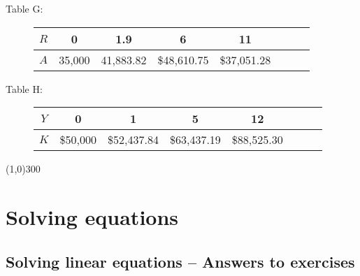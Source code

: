 \bigskip
\begin{description}
\item[\quad Table G: \quad] 
\begin{tabular} {|c| |c|c |c|c |c|c |c|}\hline
$R$ & 0 & 1.9 & 6 & 11\\ \hline
$A$ & 35,000 & 41,883.82 & \$48,610.75 &\$37,051.28  \\ \hline
\end{tabular}
\end{description}
 
\begin{description}
\item[\quad Table H: \quad] 
\begin{tabular} {|c| |c|c |c|c |c|c |c|}\hline
$Y$ & 0 & 1 & 5 & 12\\ \hline
$K$ & \$50,000 & \$52,437.84 & \$63,437.19 & \$88,525.30  \\ \hline
\end{tabular}
\end{description}
 \bigskip
 
\begin{center}
\line(1,0){300} %
\end{center}


\section{Solving equations} %

\bigskip

\subsection {Solving linear equations -- Answers to exercises} %

